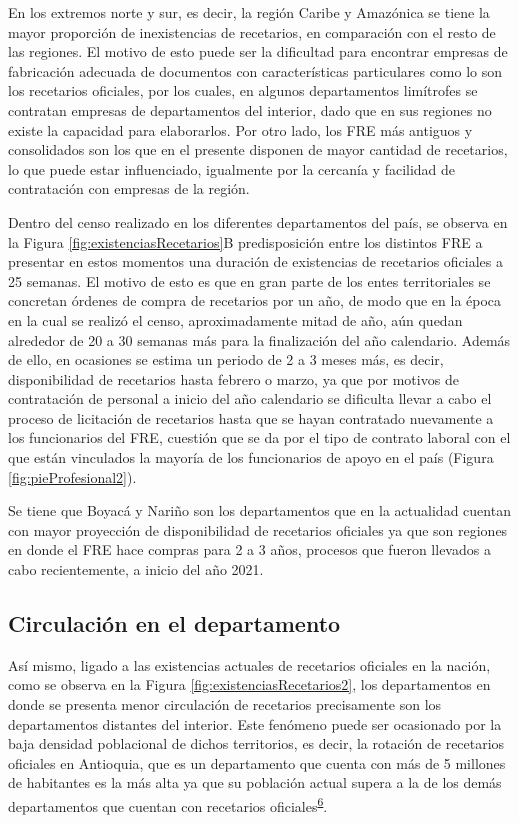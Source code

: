 \documentclass[
]{book}
\begin{document}
En los extremos norte y sur, es decir, la región Caribe y Amazónica se tiene la mayor proporción de inexistencias de recetarios, en comparación con el resto de las regiones. El motivo de esto puede ser la dificultad para encontrar empresas de fabricación adecuada de documentos con características particulares como lo son los recetarios oficiales, por los cuales, en algunos departamentos limítrofes se contratan empresas de departamentos del interior, dado que en sus regiones no existe la capacidad para elaborarlos. Por otro lado, los FRE más antiguos y consolidados son los que en el presente disponen de mayor cantidad de recetarios, lo que puede estar influenciado, igualmente por la cercanía y facilidad de contratación con empresas de la región.

Dentro del censo realizado en los diferentes departamentos del país, se observa en la Figura \ref{fig:existenciasRecetarios}B predisposición entre los distintos FRE a presentar en estos momentos una duración de existencias de recetarios oficiales a 25 semanas. El motivo de esto es que en gran parte de los entes territoriales se concretan órdenes de compra de recetarios por un año, de modo que en la época en la cual se realizó el censo, aproximadamente mitad de año, aún quedan alrededor de 20 a 30 semanas más para la finalización del año calendario. Además de ello, en ocasiones se estima un periodo de 2 a 3 meses más, es decir, disponibilidad de recetarios hasta febrero o marzo, ya que por motivos de contratación de personal a inicio del año calendario se dificulta llevar a cabo el proceso de licitación de recetarios hasta que se hayan contratado nuevamente a los funcionarios del FRE, cuestión que se da por el tipo de contrato laboral con el que están vinculados la mayoría de los funcionarios de apoyo en el país (Figura \ref{fig:pieProfesional2}).

Se tiene que Boyacá y Nariño son los departamentos que en la actualidad cuentan con mayor proyección de disponibilidad de recetarios oficiales ya que son regiones en donde el FRE hace compras para 2 a 3 años, procesos que fueron llevados a cabo recientemente, a inicio del año 2021.

\hypertarget{circulaciuxf3n-en-el-departamento}{%
\subsection{Circulación en el departamento}\label{circulaciuxf3n-en-el-departamento}}

Así mismo, ligado a las existencias actuales de recetarios oficiales en la nación, como se observa en la Figura \ref{fig:existenciasRecetarios2}, los departamentos en donde se presenta menor circulación de recetarios precisamente son los departamentos distantes del interior. Este fenómeno puede ser ocasionado por la baja densidad poblacional de dichos territorios, es decir, la rotación de recetarios oficiales en Antioquia, que es un departamento que cuenta con más de 5 millones de habitantes es la más alta ya que su población actual supera a la de los demás departamentos que cuentan con recetarios oficiales\textsuperscript{\protect\hyperlink{ref-DANE2021}{6}}.
\end{document}
